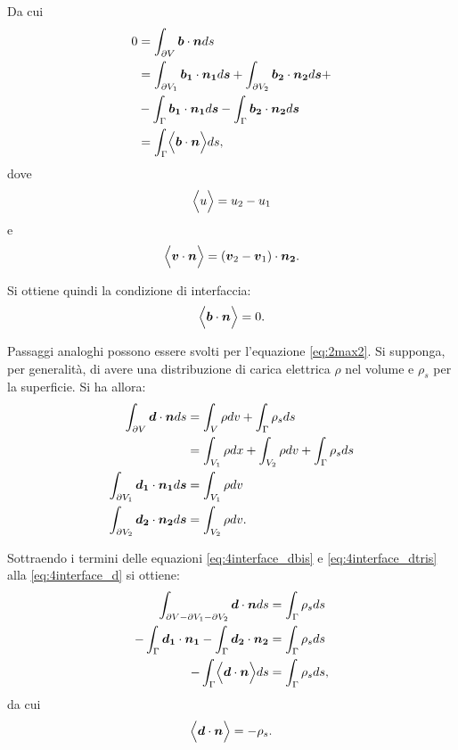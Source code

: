 Da cui
\begin{align}
\label{eq:4interface_b2}
0&=\int_{\partial V} \boldsymbol{b}\cdot \boldsymbol{n} ds\nonumber\\
&=\int_{\partial V_1} \boldsymbol{b_1}\cdot \boldsymbol{n_1} d\boldsymbol{s}+\int_{\partial V_2} \boldsymbol{b_2}\cdot \boldsymbol{n_2} d\boldsymbol{s}+\nonumber\\
&-\int_{\Gamma} \boldsymbol{b_1}\cdot \boldsymbol{n_1} d\boldsymbol{s}-\int_{\Gamma} \boldsymbol{b_2}\cdot \boldsymbol{n_2} d\boldsymbol{s}\nonumber\\
&= \int_\Gamma \Bigl\langle \boldsymbol{b} \cdot \boldsymbol{n} \Bigr\rangle ds,
\end{align}
dove
\[
\Bigl\langle u \Bigr\rangle = u_2 -u_1 
\]
e
\[
\Bigl\langle\boldsymbol{v}\cdot \boldsymbol{n}\Bigr\rangle = (\boldsymbol{v}_2 -\boldsymbol{v}_1)\cdot\boldsymbol{n_2}. 
\]

Si ottiene quindi la condizione di interfaccia:
\begin{equation}
\label{eq:4interface_b3}
\Bigl\langle \boldsymbol{b} \cdot \boldsymbol{n} \Bigr\rangle = 0.
\end{equation}

Passaggi analoghi possono essere svolti per l'equazione \eqref{eq:2max2}. Si supponga, per generalità, di avere una distribuzione di carica elettrica $\rho$ nel volume e $\rho_s$ per la superficie. Si ha allora:
\begin{align}
\label{eq:4interface_d}
\int_{\partial V} \boldsymbol{d}\cdot \boldsymbol{n} ds &= \int_{V}\rho dv + \int_\Gamma \rho_s ds\nonumber\\ 
&=\int_{V_1}\rho dx+\int_{V_2}\rho dv+\int_\Gamma \rho_s ds\\
\label{eq:4interface_dbis}
\int_{\partial V_1} \boldsymbol{d_1}\cdot \boldsymbol{n_1} d\boldsymbol{s} &= \int_{V_1}\rho dv\\
\label{eq:4interface_dtris}
\int_{\partial V_2} \boldsymbol{d_2}\cdot \boldsymbol{n_2} d\boldsymbol{s} &= \int_{V_2}\rho dv.
\end{align}

Sottraendo i termini delle equazioni \eqref{eq:4interface_dbis} e \eqref{eq:4interface_dtris} alla \eqref{eq:4interface_d} si ottiene:
\begin{align}
\label{eq:4interface_d2}
\int_{\partial V-\partial V_1-\partial V_2}\boldsymbol{d}\cdot\boldsymbol{n} ds &= \int_\Gamma \rho_s ds\nonumber\\
-\int_\Gamma \boldsymbol{d_1} \cdot \boldsymbol{n_1} -\int_\Gamma \boldsymbol{d_2} \cdot \boldsymbol{n_2} &= \int_\Gamma \rho_s ds\nonumber\\
-\int_\Gamma \Bigl\langle\boldsymbol{d} \cdot \boldsymbol{n}\Bigr\rangle ds &=\int_\Gamma \rho_s ds,
\end{align}
da cui
\begin{equation}
\label{eq:4interface_d3}
\Bigl\langle \boldsymbol{d} \cdot \boldsymbol{n} \Bigr\rangle = -\rho_s.
\end{equation}


